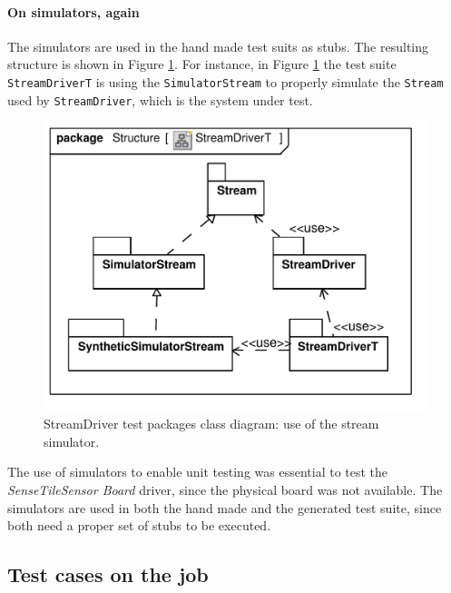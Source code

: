 \documentclass[english]{lni}
\newcommand{\lil}[1]{\texttt{\lstinline|#1|}}
\newcommand{\ST}{\emph{SenseTile}\xspace}
\newcommand{\SB}{\emph{Sensor Board}\xspace}
\newcommand{\STSB}{\ST \SB\xspace}
\begin{document}
\paragraph*{On simulators, again}

The simulators are used in the hand made test suits as stubs.
The resulting structure is shown in Figure \ref{fig:class_diagram_streamdriver_test}.  
For instance, in Figure \ref{fig:class_diagram_streamdriver_test} the test suite \lil{StreamDriverT} is using the \lil{SimulatorStream} to properly simulate the \lil{Stream} used by \lil{StreamDriver}, which is the system under test.

\begin{figure}[htb!]
  \centering
  \includegraphics[scale=0.4]{UML_model/Class_Diagram__Structure__StreamDriverT}
  \caption{StreamDriver test packages class diagram: use of the stream
    simulator.}
  \label{fig:class_diagram_streamdriver_test}
\end{figure}

The use of simulators to enable unit testing was essential to test the \STSB driver, since the physical board was not available.
The simulators are used in both the hand made and the generated test suite, since both need a proper set of stubs to be executed.



\subsection{Test cases on the job}
\label{subsec:test_cases_on_the_job}
\end{document}
